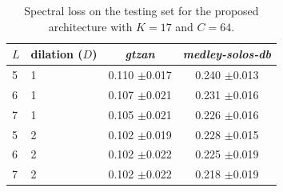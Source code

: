 \documentclass{article}
\begin{document}
\begin{table}[t]
  \caption{Spectral loss on the testing set for the proposed architecture with $K=17$ and $C=64$.}
  \label{tab:lvsd}
  \begin{center}
\begin{tabular}{llcc}
$L$ & dilation ($D$) & \textit{gtzan} & \textit{medley-solos-db} \\
\hline
5 & 1 & 0.110 $\pm$0.017 & 0.240 $\pm$0.013 \\
6 & 1 & 0.107 $\pm$0.021 & 0.231 $\pm$0.016 \\
7 & 1 & 0.105 $\pm$0.021 & 0.226 $\pm$0.016 \\
5 & 2 & 0.102 $\pm$0.019 & 0.228 $\pm$0.015 \\
6 & 2 & 0.102 $\pm$0.022 & 0.225 $\pm$0.019 \\
7 & 2 & 0.102 $\pm$0.022 & 0.218 $\pm$0.019 \\
\end{tabular}
\end{center}
\vspace{-4mm}
\end{table}






\end{document}
